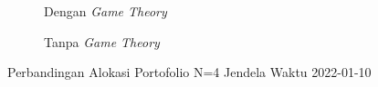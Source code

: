 %         
% 
% 
%         
% 
% 

\begin{figure}[!htbp]
    \centering
    \begin{subfigure}[b]{0.48\textwidth}
        \centering
        


        \caption{Dengan \textit{Game Theory}}
    \end{subfigure}
    \hfill
    \begin{subfigure}[b]{0.48\textwidth}
        \centering
        


        \caption{Tanpa \textit{Game Theory}}
    \end{subfigure}
    \caption{Perbandingan Alokasi Portofolio N=4 Jendela Waktu 2022-01-10}
    \label{fig:window_n4_2022_01_10}
\end{figure}

%         
% 
% 
%         
% 
% 

